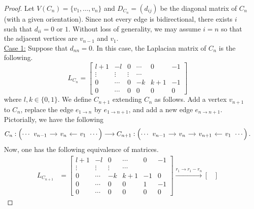 \documentclass[11pt,reqno]{amsart}
\theoremstyle{definition}
\theoremstyle{plain}
\begin{document}
\begin{proof}
Let $V(C_n)=\{v_1,\dots,v_n\}$ and $D_{C_n} = (d_{ij})$ be the diagonal matrix of $C_n$ (with a given orientation). Since not every edge is bidirectional, there exists $i$ such that $d_{ii} = 0$ or $1$. Without loss of generality, we may assume $i = n$ so that the adjacent vertices are $v_{n-1}$ and $v_1$. \\

\noindent \underline{Case 1:} Suppose that $d_{nn} = 0$. In this case, the Laplacian matrix of $C_n$ is the following. 
\begin{equation}
			L_{C_n} = 
			\begin{bmatrix}
				l + 1 & -l & 0 & \cdots & 0 & -1 \\
				\vdots & \vdots & \vdots & \cdots \\
				0 & \cdots & 0 & -k & k+1 & -1 \\
				0 & \cdots & 0 & 0 & 0 & 0 
			\end{bmatrix}
\end{equation}
			where $l, k \in \{ 0, 1 \}$. 
			We define $C_{n+1}$ extending $C_n$ as follows. 
			Add a vertex $v_{n+1}$ to $C_n$, replace the edge $e_{1\to n}$ by $e_{1 \to n+1}$, and add a new edge $e_{n \to n+1}$. 
			Pictorially, we have the following
			\begin{equation} \label{obj1}
				C_n: \left( \cdots \begin{tikzcd}[column sep=0.4cm]
					v_{n-1} \arrow[r] & v_n & v_1 \arrow[l] 
				\end{tikzcd} \cdots \right)
				\longrightarrow
				C_{n+1}: \left( \cdots \begin{tikzcd}[column sep=0.4cm]
					v_{n-1} \arrow[r] & v_n \arrow[r] & v_{n+1} &  v_1 \arrow[l] 
				\end{tikzcd} \cdots \right).
			\end{equation}
Now, one has the following equivalence of matrices.
			\begin{align*}
			L_{C_{n+1}} &= 
			\begin{bmatrix} 
				l + 1 & -l & 0 & \cdots & 0 & -1 \\
				\vdots & \vdots & \vdots & \cdots \\
				0 & \cdots & -k & k+1 & -1 &0 \\
				0 & \cdots & 0 & 0 & 1 & -1 \\
				0 & \cdots & 0 & 0 & 0 & 0 
			\end{bmatrix} 
			\stackrel{r_{1} \to r_1 - r_{n}}\longrightarrow
			\begin{bmatrix} 

\end{bmatrix}
\end{align*}
\end{proof}
\end{document}

